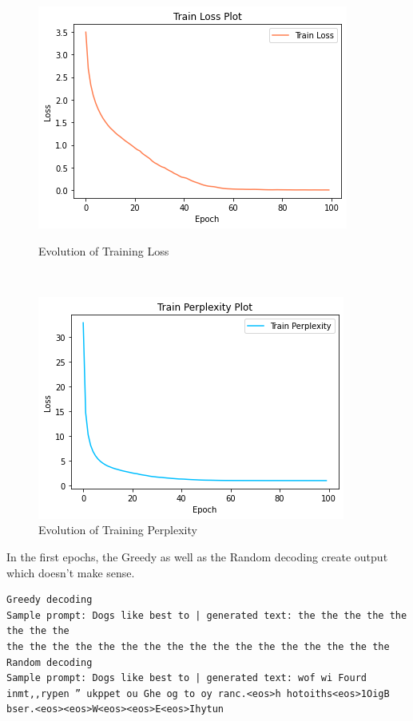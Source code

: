 \documentclass{article}
\begin{document}
\begin{figure}[ht]
    \begin{minipage}[c]{.60\textwidth}
			\centering
			\includegraphics[width=\linewidth]{images/train_loss.png}
			\caption{Evolution of Training Loss}
		\end{minipage}
		~
		\begin{minipage}[c]{.60\textwidth}
			\centering
			\includegraphics[width=\linewidth]{images/perplexity.png}
			\caption{Evolution of Training Perplexity}
		\end{minipage}
\end{figure}
In the first epochs, the Greedy as well as the Random decoding create output which doesn't make sense.
\begin{lstlisting}
Greedy decoding
Sample prompt: Dogs like best to | generated text: the the the the the the the the 
the the the the the the the the the the the the the the the the the 
Random decoding
Sample prompt: Dogs like best to | generated text: wof wi Fourd inmt,,rypen ” ukppet ou Ghe og to oy ranc.<eos>h hotoiths<eos>1OigB bser.<eos><eos>W<eos><eos>E<eos>Ihytun
\end{lstlisting}
\end{document}
